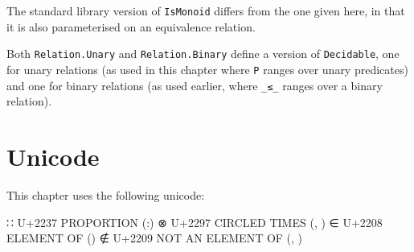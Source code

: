 The standard library version of \texttt{IsMonoid} differs from the one
given here, in that it is also parameterised on an equivalence relation.

Both \texttt{Relation.Unary} and \texttt{Relation.Binary} define a
version of \texttt{Decidable}, one for unary relations (as used in this
chapter where \texttt{P} ranges over unary predicates) and one for
binary relations (as used earlier, where \texttt{\_≤\_} ranges over a
binary relation).

\hypertarget{unicode}{%
\section{Unicode}\label{unicode}}

This chapter uses the following unicode:

\begin{myDisplay}
∷  U+2237  PROPORTION  (\::)
⊗  U+2297  CIRCLED TIMES  (\otimes, \ox)
∈  U+2208  ELEMENT OF  (\in)
∉  U+2209  NOT AN ELEMENT OF  (\inn, \notin)
\end{myDisplay}

